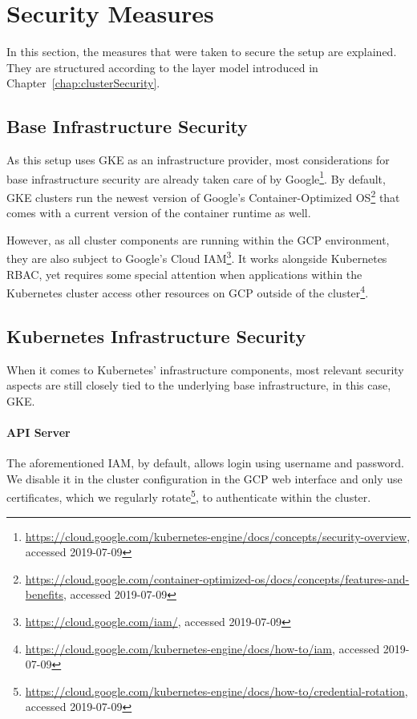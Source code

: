 \section{Security Measures}

In this section, the measures that were taken to secure the setup are explained. They are structured according to the layer model introduced in Chapter~\ref{chap:clusterSecurity}.

\subsection{Base Infrastructure Security}

As this setup uses \ac{GKE} as an infrastructure provider, most considerations for base infrastructure security are already taken care of by Google\footnote{\url{https://cloud.google.com/kubernetes-engine/docs/concepts/security-overview}, accessed 2019-07-09}. By default, \ac{GKE} clusters run the newest version of Google's Container-Optimized OS\footnote{\url{https://cloud.google.com/container-optimized-os/docs/concepts/features-and-benefits}, accessed 2019-07-09} that comes with a current version of the container runtime as well. 

However, as all cluster components are running within the \ac{GCP} environment, they are also subject to Google's Cloud \ac{IAM}\footnote{\url{https://cloud.google.com/iam/}, accessed 2019-07-09}. It works alongside Kubernetes \ac{RBAC}, yet requires some special attention when applications within the Kubernetes cluster access other resources on \ac{GCP} outside of the cluster\footnote{\url{https://cloud.google.com/kubernetes-engine/docs/how-to/iam}, accessed 2019-07-09}.

\subsection{Kubernetes Infrastructure Security}

When it comes to Kubernetes' infrastructure components, most relevant security aspects are still closely tied to the underlying base infrastructure, in this case, \ac{GKE}.

\paragraph{API Server}

The aforementioned \ac{IAM}, by default, allows login using username and password. We disable it in the cluster configuration in the \ac{GCP} web interface and only use certificates, which we regularly rotate\footnote{\url{https://cloud.google.com/kubernetes-engine/docs/how-to/credential-rotation}, accessed 2019-07-09}, to authenticate within the cluster.

